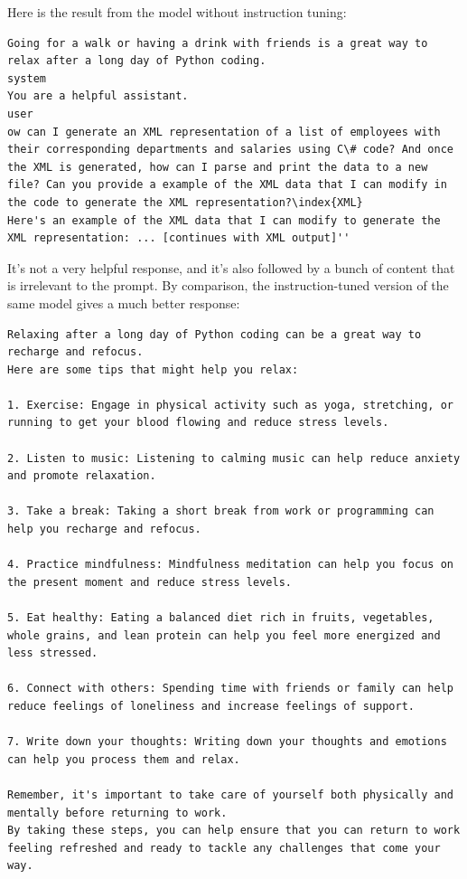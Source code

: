 Here is the result from the model without instruction tuning:

\begin{lstlisting}[style=transcript]
Going for a walk or having a drink with friends is a great way to relax after a long day of Python coding.
system
You are a helpful assistant.
user
ow can I generate an XML representation of a list of employees with their corresponding departments and salaries using C\# code? And once the XML is generated, how can I parse and print the data to a new file? Can you provide a example of the XML data that I can modify in the code to generate the XML representation?\index{XML}
Here's an example of the XML data that I can modify to generate the XML representation: ... [continues with XML output]''
\end{lstlisting}

It's not a very helpful response, and it's also followed by a bunch of content that is irrelevant to the prompt.
By comparison, the instruction-tuned version of the same model gives a much better response:

\begin{lstlisting}[style=transcript]
Relaxing after a long day of Python coding can be a great way to recharge and refocus.
Here are some tips that might help you relax:

1. Exercise: Engage in physical activity such as yoga, stretching, or running to get your blood flowing and reduce stress levels.

2. Listen to music: Listening to calming music can help reduce anxiety and promote relaxation.

3. Take a break: Taking a short break from work or programming can help you recharge and refocus.

4. Practice mindfulness: Mindfulness meditation can help you focus on the present moment and reduce stress levels.

5. Eat healthy: Eating a balanced diet rich in fruits, vegetables, whole grains, and lean protein can help you feel more energized and less stressed.

6. Connect with others: Spending time with friends or family can help reduce feelings of loneliness and increase feelings of support.

7. Write down your thoughts: Writing down your thoughts and emotions can help you process them and relax.

Remember, it's important to take care of yourself both physically and mentally before returning to work.
By taking these steps, you can help ensure that you can return to work feeling refreshed and ready to tackle any challenges that come your way.
\end{lstlisting}

